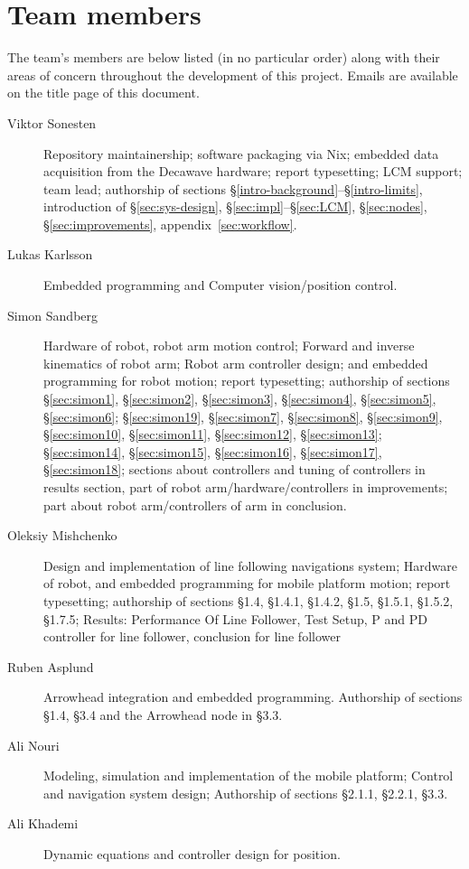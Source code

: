 \section{Team members}
The team's members are below listed (in no particular order) along with their areas of concern throughout the development of this project.
Emails are available on the title page of this document.

\begin{description}
\item[Viktor Sonesten] Repository maintainership; software packaging via
  Nix; embedded data acquisition from the Decawave hardware; report
  typesetting; LCM support; team lead; authorship of sections
  §\ref{intro-background}--§\ref{intro-limits}, introduction of
  §\ref{sec:sys-design}, §\ref{sec:impl}--§\ref{sec:LCM},
  §\ref{sec:nodes}, §\ref{sec:improvements},
  appendix~\ref{sec:workflow}.

    \item[Lukas Karlsson]
    Embedded programming and
    Computer vision/position control.

    \item[Simon Sandberg]
    Hardware of robot, robot arm motion control;
    Forward and inverse kinematics of robot arm;
    Robot arm controller design;
    and embedded programming for robot motion; report
    typesetting; authorship of sections §\ref{sec:simon1}, §\ref{sec:simon2}, §\ref{sec:simon3}, §\ref{sec:simon4}, §\ref{sec:simon5}, §\ref{sec:simon6};
    §\ref{sec:simon19}, §\ref{sec:simon7}, §\ref{sec:simon8}, §\ref{sec:simon9}, §\ref{sec:simon10}, §\ref{sec:simon11}, §\ref{sec:simon12}, §\ref{sec:simon13};
    §\ref{sec:simon14}, §\ref{sec:simon15}, §\ref{sec:simon16}, §\ref{sec:simon17}, §\ref{sec:simon18};
    sections about controllers and tuning of controllers in results section, part of robot arm/hardware/controllers in improvements;
    part about robot arm/controllers of arm in conclusion.

    \item[Oleksiy Mishchenko]
    Design and implementation of line following navigations system;
    Hardware of robot, and embedded programming for mobile platform motion; report
     typesetting; authorship of sections §1.4, §1.4.1, §1.4.2, §1.5, §1.5.1, §1.5.2, §1.7.5;
     Results: Performance Of Line Follower, Test Setup, P and PD controller for line follower, conclusion for line follower

    \item[Ruben Asplund]
    Arrowhead integration and embedded programming.
    Authorship of sections §1.4, §3.4 and the Arrowhead node in §3.3.

    \item[Ali Nouri]
    Modeling, simulation and implementation of the mobile platform;
    Control and navigation system design;
    Authorship of sections §2.1.1, §2.2.1, §3.3.

    \item[Ali Khademi]
    Dynamic equations and controller design for position.
\end{description}
